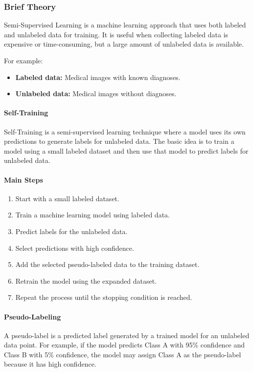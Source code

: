 \documentclass[a4paper,11pt]{article}
\begin{document}
\subsubsection{Brief Theory}
Semi-Supervised Learning is a machine learning approach that uses both labeled and unlabeled data for training. It is useful when collecting labeled data is expensive or time-consuming, but a large amount of unlabeled data is available.

For example:
\begin{itemize}
    \item \textbf{Labeled data:} Medical images with known diagnoses.
    \item \textbf{Unlabeled data:} Medical images without diagnoses.
\end{itemize}

\paragraph{Self-Training}
Self-Training is a semi-supervised learning technique where a model uses its own predictions to generate labels for unlabeled data. The basic idea is to train a model using a small labeled dataset and then use that model to predict labels for unlabeled data.

\paragraph{Main Steps}
\begin{enumerate}
    \item Start with a small labeled dataset.
    \item Train a machine learning model using labeled data.
    \item Predict labels for the unlabeled data.
    \item Select predictions with high confidence.
    \item Add the selected pseudo-labeled data to the training dataset.
    \item Retrain the model using the expanded dataset.
    \item Repeat the process until the stopping condition is reached.
\end{enumerate}

\paragraph{Pseudo-Labeling}
A pseudo-label is a predicted label generated by a trained model for an unlabeled data point. For example, if the model predicts Class A with 95\% confidence and Class B with 5\% confidence, the model may assign Class A as the pseudo-label because it has high confidence.
\end{document}
